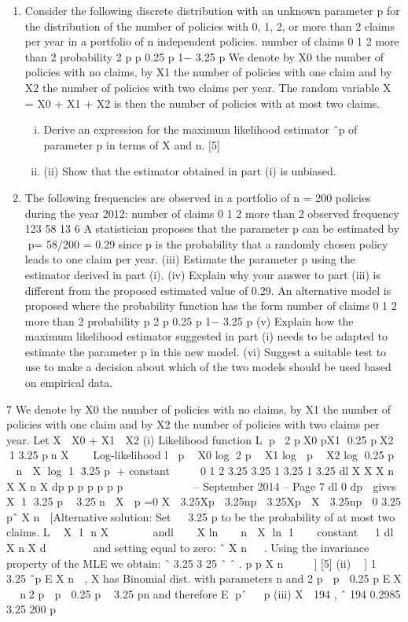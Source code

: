\documentclass[a4paper,12pt]{article}
\begin{document}
\begin{enumerate}
\item Consider the following discrete distribution with an unknown parameter p for the
distribution of the number of policies with 0, 1, 2, or more than 2 claims per year in a
portfolio of n independent policies.
number of claims 0 1 2 more than 2
probability 2 p p 0.25 p 1− 3.25 p
We denote by X0 the number of policies with no claims, by X1 the number of policies
with one claim and by X2 the number of policies with two claims per year. The
random variable X = X0 + X1 + X2 is then the number of policies with at most two
claims.
\begin{enumerate}[(i)]
\item  Derive an expression for the maximum likelihood estimator ˆp of parameter p
in terms of X and n. [5]
\item (ii) Show that the estimator obtained in part (i) is unbiased. 
\end{enumerate}
\item 
The following frequencies are observed in a portfolio of n = 200 policies during the
year 2012:
  number of claims 0 1 2 more than 2
observed frequency 123 58 13 6
A statistician proposes that the parameter p can be estimated by 􀀄p= 58/200 = 0.29
since p is the probability that a randomly chosen policy leads to one claim per year.
(iii) Estimate the parameter p using the estimator derived in part (i). 
(iv) Explain why your answer to part (iii) is different from the proposed estimated
value of 0.29. 
An alternative model is proposed where the probability function has the form
number of claims 0 1 2 more than 2
probability p 2 p 0.25 p 1− 3.25 p
(v) Explain how the maximum likelihood estimator suggested in part (i) needs to
be adapted to estimate the parameter p in this new model. 
(vi) Suggest a suitable test to use to make a decision about which of the two
models should be used based on empirical data. 
\end{enumerate}
\newpage


7 We denote by X0 the number of policies with no claims, by X1 the number of
policies with one claim and by X2 the number of policies with two claims per year.
Let X  X0 + X1  X2
(i) Likelihood function
L p 2 pX0 pX1 0.25 pX2 1 3.25 pn X   
Log-likelihood
l  p  X0 log 2 p  X1 log  p  X2 log 0.25 p  n  X log 1 3.25 p
+ constant
    0 1 2 3.25 3.25
1 3.25 1 3.25
dl X X X n X X n X
dp p p p p p p
 
     
 
 – September 2014 – %
Page 7
dl 0
dp
 gives X 1 3.25 p  3.25n  X  p =0
X  3.25Xp  3.25np  3.25Xp  X  3.25np  0
3.25
pˆ X
n

[Alternative solution:
   Set   3.25 p to be the probability of at most two claims.
 L  X 1 n X       andl   X ln  n  X ln 1   constant
  
 1
 dl X n X
 d
 
  
   
 and setting equal to zero: ˆ X
 n
   .
 Using the invariance property of the MLE we obtain:
   ˆ 3.25
 3 25
 ˆ ˆ
 .
 p p X
 n
     ] [5]
(ii) 􀜧􁈾 ] 1  
3.25
ˆp E X
n
 , X has Binomial dist. with parameters n and
2 p  p  0.25 p
EX   n2 p  p  0.25 p  3.25 pn
and therefore E pˆ   p 
(iii) X  194 , ˆ 194 0.2985
3.25 200
p 

\end{document}
